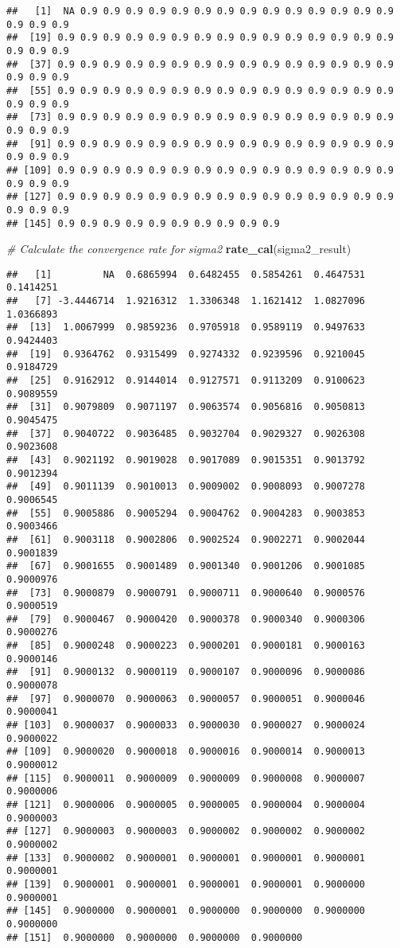 \documentclass[]{article}
\newenvironment{Shaded}{\begin{snugshade}}{\end{snugshade}}
\newcommand{\CommentTok}[1]{\textcolor[rgb]{0.56,0.35,0.01}{\textit{#1}}}
\newcommand{\KeywordTok}[1]{\textcolor[rgb]{0.13,0.29,0.53}{\textbf{#1}}}
\newcommand{\NormalTok}[1]{#1}
\begin{document}
\begin{verbatim}
##   [1]  NA 0.9 0.9 0.9 0.9 0.9 0.9 0.9 0.9 0.9 0.9 0.9 0.9 0.9 0.9 0.9 0.9 0.9
##  [19] 0.9 0.9 0.9 0.9 0.9 0.9 0.9 0.9 0.9 0.9 0.9 0.9 0.9 0.9 0.9 0.9 0.9 0.9
##  [37] 0.9 0.9 0.9 0.9 0.9 0.9 0.9 0.9 0.9 0.9 0.9 0.9 0.9 0.9 0.9 0.9 0.9 0.9
##  [55] 0.9 0.9 0.9 0.9 0.9 0.9 0.9 0.9 0.9 0.9 0.9 0.9 0.9 0.9 0.9 0.9 0.9 0.9
##  [73] 0.9 0.9 0.9 0.9 0.9 0.9 0.9 0.9 0.9 0.9 0.9 0.9 0.9 0.9 0.9 0.9 0.9 0.9
##  [91] 0.9 0.9 0.9 0.9 0.9 0.9 0.9 0.9 0.9 0.9 0.9 0.9 0.9 0.9 0.9 0.9 0.9 0.9
## [109] 0.9 0.9 0.9 0.9 0.9 0.9 0.9 0.9 0.9 0.9 0.9 0.9 0.9 0.9 0.9 0.9 0.9 0.9
## [127] 0.9 0.9 0.9 0.9 0.9 0.9 0.9 0.9 0.9 0.9 0.9 0.9 0.9 0.9 0.9 0.9 0.9 0.9
## [145] 0.9 0.9 0.9 0.9 0.9 0.9 0.9 0.9 0.9 0.9
\end{verbatim}

\begin{Shaded}
\begin{Highlighting}[]
\CommentTok{# Calculate the convergence rate for sigma2}
\KeywordTok{rate_cal}\NormalTok{(sigma2_result)}
\end{Highlighting}
\end{Shaded}

\begin{verbatim}
##   [1]         NA  0.6865994  0.6482455  0.5854261  0.4647531  0.1414251
##   [7] -3.4446714  1.9216312  1.3306348  1.1621412  1.0827096  1.0366893
##  [13]  1.0067999  0.9859236  0.9705918  0.9589119  0.9497633  0.9424403
##  [19]  0.9364762  0.9315499  0.9274332  0.9239596  0.9210045  0.9184729
##  [25]  0.9162912  0.9144014  0.9127571  0.9113209  0.9100623  0.9089559
##  [31]  0.9079809  0.9071197  0.9063574  0.9056816  0.9050813  0.9045475
##  [37]  0.9040722  0.9036485  0.9032704  0.9029327  0.9026308  0.9023608
##  [43]  0.9021192  0.9019028  0.9017089  0.9015351  0.9013792  0.9012394
##  [49]  0.9011139  0.9010013  0.9009002  0.9008093  0.9007278  0.9006545
##  [55]  0.9005886  0.9005294  0.9004762  0.9004283  0.9003853  0.9003466
##  [61]  0.9003118  0.9002806  0.9002524  0.9002271  0.9002044  0.9001839
##  [67]  0.9001655  0.9001489  0.9001340  0.9001206  0.9001085  0.9000976
##  [73]  0.9000879  0.9000791  0.9000711  0.9000640  0.9000576  0.9000519
##  [79]  0.9000467  0.9000420  0.9000378  0.9000340  0.9000306  0.9000276
##  [85]  0.9000248  0.9000223  0.9000201  0.9000181  0.9000163  0.9000146
##  [91]  0.9000132  0.9000119  0.9000107  0.9000096  0.9000086  0.9000078
##  [97]  0.9000070  0.9000063  0.9000057  0.9000051  0.9000046  0.9000041
## [103]  0.9000037  0.9000033  0.9000030  0.9000027  0.9000024  0.9000022
## [109]  0.9000020  0.9000018  0.9000016  0.9000014  0.9000013  0.9000012
## [115]  0.9000011  0.9000009  0.9000009  0.9000008  0.9000007  0.9000006
## [121]  0.9000006  0.9000005  0.9000005  0.9000004  0.9000004  0.9000003
## [127]  0.9000003  0.9000003  0.9000002  0.9000002  0.9000002  0.9000002
## [133]  0.9000002  0.9000001  0.9000001  0.9000001  0.9000001  0.9000001
## [139]  0.9000001  0.9000001  0.9000001  0.9000001  0.9000000  0.9000001
## [145]  0.9000000  0.9000001  0.9000000  0.9000000  0.9000000  0.9000000
## [151]  0.9000000  0.9000000  0.9000000  0.9000000
\end{verbatim}
\end{document}
